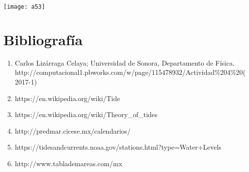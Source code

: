 \documentclass[12pt,a4paper]{article}
\begin{document}
\begin{center}
\texttt{[image: a53]}
\end{center}

\newpage

\section{Bibliografía}

\begin{enumerate}

\item  Carlos Lizárraga Celaya; Universidad de Sonora, Departamento de Física. \\ http://computacional1.pbworks.com/w/page/115478932/Actividad\%204\%20(2017-1)
\item https://en.wikipedia.org/wiki/Tide

\item https://en.wikipedia.org/wiki/Theory\_of\_tides

\item http://predmar.cicese.mx/calendarios/

\item https://tidesandcurrents.noaa.gov/stations.html?type=Water+Levels

\item http://www.tablademareas.com/mx

\end{enumerate}
\end{document}
